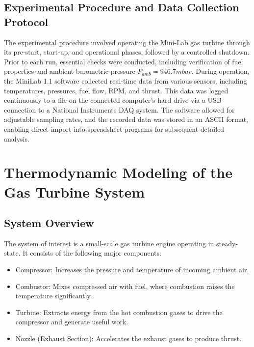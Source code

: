 \documentclass[
  12pt,
  oneside,
  a4paper,
  english,
  brazil]{abntex2}
\begin{document}
\subsection{Experimental Procedure and Data Collection
Protocol}\label{experimental-procedure-and-data-collection-protocol}

The experimental procedure involved operating the Mini-Lab gas turbine
through its pre-start, start-up, and operational phases, followed by a
controlled shutdown. Prior to each run, essential checks were conducted,
including verification of fuel properties and ambient barometric
pressure \(P_{amb}=946.7 mbar\). During operation, the MiniLab 1.1
software collected real-time data from various sensors, including
temperatures, pressures, fuel flow, RPM, and thrust. This data was
logged continuously to a file on the connected computer's hard drive via
a USB connection to a National Instruments DAQ system. The software
allowed for adjustable sampling rates, and the recorded data was stored
in an ASCII format, enabling direct import into spreadsheet programs for
subsequent detailed analysis.

\section{\texorpdfstring{\textbf{Thermodynamic Modeling of the Gas
Turbine
System}}{Thermodynamic Modeling of the Gas Turbine System}}\label{thermodynamic-modeling-of-the-gas-turbine-system}

\subsection{System Overview}\label{system-overview}

The system of interest is a small-scale gas turbine engine operating in
steady-state. It consists of the following major components:

\begin{itemize}
    \item Compressor: Increases the pressure and temperature of incoming ambient air.
    \item Combustor: Mixes compressed air with fuel, where combustion raises the temperature significantly.
    \item Turbine: Extracts energy from the hot combustion gases to drive the compressor and generate useful work.
    \item Nozzle (Exhaust Section): Accelerates the exhaust gases to produce thrust.
\end{itemize}
\end{document}
